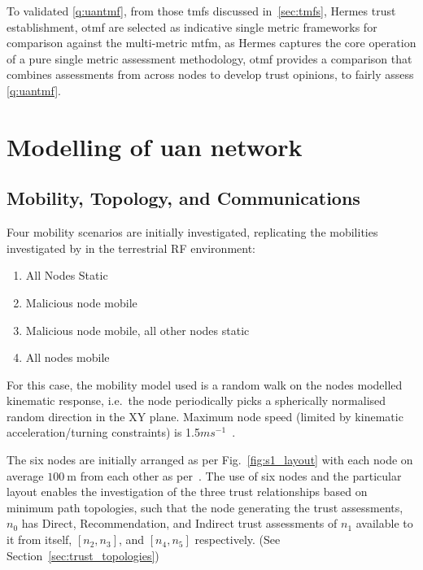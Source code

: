 To validated \ref{q:uantmf}, from those \glspl{tmf} discussed in~\autoref{sec:tmfs}, Hermes trust establishment, \gls{otmf} are selected as indicative single metric frameworks for comparison against the multi-metric \gls{mtfm}, as Hermes captures the core operation of a pure single metric assessment methodology, \gls{otmf} provides a comparison that combines assessments from across nodes to develop trust opinions, to fairly assess \ref{q:uantmf}.


\section{Modelling of \gls{uan} network}\label{sec:initialsystemcharacterization}

\subsection{Mobility, Topology, and Communications}

Four mobility scenarios are initially investigated, replicating the mobilities investigated by \citet{Guo11} in the terrestrial RF environment:
\begin{enumerate}
	\item All Nodes Static
	\item Malicious node mobile
	\item Malicious node mobile, all other nodes static
	\item All nodes mobile
\end{enumerate}

For this case, the mobility model used is a random walk on the nodes modelled kinematic response, i.e.\ the node periodically picks a spherically normalised random direction in the XY plane.
Maximum node speed (limited by kinematic acceleration/turning constraints) is 1.5$ms^{-1}$~\cite{Milgram2001}.

The six nodes are initially arranged as per Fig.~\ref{fig:s1_layout} with each node on average $\SI{100}{\meter}$ from each other as per~\citet{Guo11}.
The use of six nodes and the particular layout enables the investigation of the three trust relationships based on minimum path topologies, such that the node generating the trust assessments, $n_0$ has Direct, Recommendation, and Indirect trust assessments of $n_1$ available to it from itself, $[n_2,n_3]$, and $[n_4,n_5]$ respectively. 
(See Section~\ref{sec:trust_topologies})

